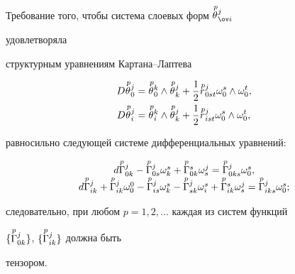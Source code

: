 Требование того, чтобы система слоевых форм $\up{\,p}{\theta}^j_{\ov i}$ 


удовлетворяла  


структурным уравнениям Картана--Лаптева 


\begin{equation} 


\begin{split} 


D\up{\,p}{\theta}^j_0&=\up{\,p}{\theta}^k_0\wedge 


\up{\,p}{\theta}^j_k+\frac{1}{2}\up{\,p}{r}^j_{0s t} 


\omega^s_0\wedge\omega^t_0,\\ 


D\up{\,p}{\theta}^j_i&=\up{\,p}{\theta}^k_i\wedge 


\up{\,p}{\theta}^j_k+\frac{1}{2}\up{\,p}{r}^j_{is t} 


\omega^s_0\wedge\omega^t_0, 


\end{split} 


\end{equation} 


равносильно следующей системе дифференциальных уравнений: 


\begin{equation} 


\begin{array}{c} 


d\up{p}{\Gamma}^j_{0k}-\up{p}{\Gamma}^j_{0s}\omega^s_k+ 


\up{p}{\Gamma}^s_{0k}\omega^j_s=\up{p}{\Gamma}^j_{0k s}\omega^s_0,\\ 


%


d\up{p}{\Gamma}^j_{i k}+\up{p}{\Gamma}^j_{i k}\omega^0_0- 


\up{p}{\Gamma}^j_{is}\omega^s_k-\up{p}{\Gamma}^j_{s k} 


\omega^s_i+\up{p}{\Gamma}^s_{i k}\omega^j_s= 


\up{p}{\Gamma}^j_{i k s}\omega^s_0; 


\end{array} 


\end{equation} 


следовательно, при любом $p=1,2,\dotsc$ каждая из систем функций 


$\{\overset{p}{\Gamma}{}^j_{0k}\}$, $\{\overset{p}{\Gamma}{}^j_{i k}\}$ должна быть 


тензором. 


